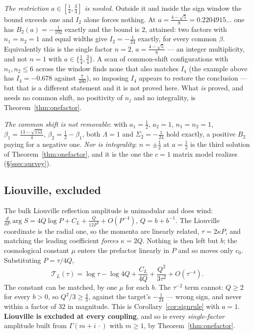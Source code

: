 \emph{The restriction $a\in[\frac14,\frac34]$ is needed.} Outside it and inside
the sign window the bound exceeds one and $I_2$ alone forces nothing. At
$a=\frac{4-\sqrt5}8=0.2204915\ldots$ one has $B_2(a)=-\frac1{192}$ exactly and the
bound is $2$, attained: two factors with $n_1=n_2=1$ and equal widths give
$I_2=-\frac1{24}$ exactly, for every common $\beta$. Equivalently this is the
single factor $n=2$, $a=\frac{4-\sqrt5}8$ --- an integer multiplicity, and not
$n=1$ with $a\in\{\frac14,\frac34\}$. A scan of common-shift configurations with
$n_1,n_2\leq6$ across the window finds none that also matches $I_4$ (the example
above has $I_4=-0.678$ against $\frac7{480}$), so imposing $I_4$ appears to restore
the conclusion --- but that is a different statement and it is not proved here.
What \emph{is} proved, and needs no common shift, no positivity of $n_j$ and no
integrality, is Theorem~\ref{thm:onefactor}.

\emph{The common shift is not removable}: with $a_1=\frac12$, $a_2=1$,
$n_1=n_2=1$, $\beta_1=\frac{13-\sqrt{153}}4$, $\beta_2=\frac12-\beta_1$, both
$\Lambda=1$ and $\Sigma_2=-\frac1{24}$ hold exactly, a positive $B_2$ paying for a
negative one. \emph{Nor is integrality}: $n=\pm\frac12$ at $a=\frac12$ is the
third solution of Theorem~\ref{thm:onefactor}, and it is the one the $c=1$ matrix
model realizes (\S\ref{ssec:survey}).

\subsection{Liouville, excluded}\label{ssec:liouville}

The bulk Liouville reflection amplitude is unimodular and does wind:
$\frac{d}{dP}\arg S=4Q\log P+C_L+\frac{Q}{12P^2}+O(P^{-4})$, $Q=b+b^{-1}$.
The Liouville coordinate is the radial one, so the momenta are linearly related,
$\tau=2\kappa P$, and matching the leading coefficient \emph{forces} $\kappa=2Q$.
Nothing is then left but $b$; the cosmological constant $\mu$ enters the
prefactor linearly in $P$ and so moves only $c_0$. Substituting $P=\tau/4Q$,
\[
 \mathcal T_L(\tau)=\log\tau-\log4Q+\frac{C_L}{4Q}+\frac{Q^2}{3\tau^2}+O(\tau^{-4}) .
\]
The constant can be matched, by one $\mu$ for each $b$. The $\tau^{-2}$ term
cannot: $Q\geq2$ for every $b>0$, so $Q^2/3\geq\frac43$, against the target's
$-\frac1{24}$ --- wrong sign, and never within a factor of $32$ in magnitude.
This is Corollary~\ref{cor:signrule} with $a=1$. \textbf{Liouville is excluded at
every coupling}, and so is every \emph{single-factor} amplitude built from
$\Gamma(m+i\,\cdot)$ with $m\geq1$, by Theorem~\ref{thm:onefactor}.

